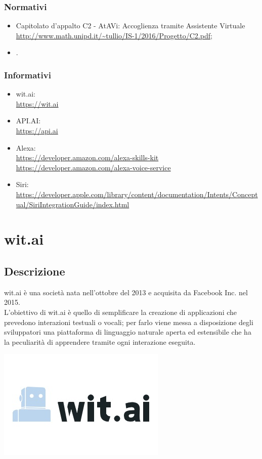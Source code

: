 \documentclass[a4paper,titlepage]{article}
\begin{document}
		\subsubsection{Normativi}
			\begin{itemize}
				\item Capitolato d'appalto C2 - AtAVi: Accoglienza tramite Assistente Virtuale \\	\url{http://www.math.unipd.it/~tullio/IS-1/2016/Progetto/C2.pdf};
				\item \NPdoc.
			\end{itemize}
		\subsubsection{Informativi}
			\begin{itemize}
				\item wit.ai: \\
				\url{https://wit.ai}
				\item API.AI: \\
				\url{https://api.ai}
				\item Alexa: \\
				\url{https://developer.amazon.com/alexa-skills-kit} \\
				\url{https://developer.amazon.com/alexa-voice-service}
				\item Siri: \\
				\url{https://developer.apple.com/library/content/documentation/Intents/Conceptual/SiriIntegrationGuide/index.html}
			\end{itemize}
\newpage
\section{wit.ai}
	\subsection{Descrizione}
		\begin{minipage}{0.7\textwidth}\raggedright
			wit.ai è una società nata nell'ottobre del 2013 e acquisita da Facebook Inc. nel 2015. \\
			L'obiettivo di wit.ai è quello di semplificare la creazione di applicazioni che prevedono interazioni testuali o vocali; per farlo viene messa a disposizione degli sviluppatori una piattaforma di linguaggio naturale aperta ed estensibile che ha la peculiarità di apprendere tramite ogni interazione eseguita.
		\end{minipage}
		\hfill
		\noindent\begin{minipage}{0.15\textwidth}
		\includegraphics[scale=0.6]{images/witai.jpg}
		\end{minipage}
\end{document}
